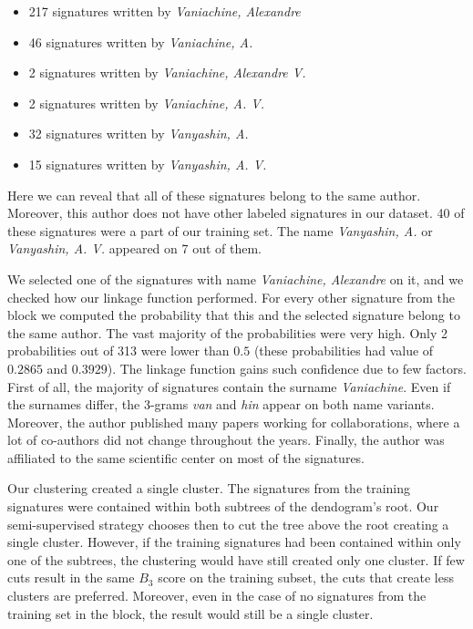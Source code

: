 \documentclass{pracamgr}
\begin{document}
\begin{itemize}

\item{217 signatures written by \textit{Vaniachine, Alexandre}}
\item{46 signatures written by \textit{Vaniachine, A.}}
\item{2 signatures written by \textit{Vaniachine, Alexandre V.}}
\item{2 signatures written by \textit{Vaniachine, A. V.}}
\item{32 signatures written by \textit{Vanyashin, A.}}
\item{15 signatures written by \textit{Vanyashin, A. V.}}

\end{itemize}

Here we can reveal that all of these signatures belong to the same author. Moreover, this
author does not have other labeled signatures in our dataset. 40 of these signatures
were a part of our training set. The name \textit{Vanyashin, A.}
or \textit{Vanyashin, A. V.} appeared on 7 out of them.

We selected one of the signatures with name \textit{Vaniachine, Alexandre} on it, and we checked
how our linkage function performed. 
For every other signature from the block we computed the probability that this and the selected
signature belong to the same author. The vast majority of the probabilities were very high.
Only 2 probabilities
out of 313 were lower than $0.5$ (these probabilities had value of $0.2865$ and $0.3929$).
The linkage function gains such confidence due to few factors. First of all, the majority
of signatures contain the surname \textit{Vaniachine}. Even if the
surnames differ, the 3-grams \textit{van} and \textit{hin} appear on both name variants.
Moreover, the author published many papers working for collaborations, where a lot
of co-authors did not change throughout the years. Finally, the author was affiliated
to the same scientific center on most of the signatures.

Our clustering created a single cluster. The signatures from the training signatures
were contained within both subtrees of the dendogram's root. Our semi-supervised strategy
chooses then to cut the tree above the root creating a single cluster. However, if the training signatures
had been contained within only one of the subtrees, the clustering would have still created
only one cluster. If few cuts result in the same $B_{3}$ score on the training subset,
the cuts that create less clusters are preferred. Moreover, even in the case of no signatures
from the training set in the block, the result would still be a single cluster.
\end{document}
